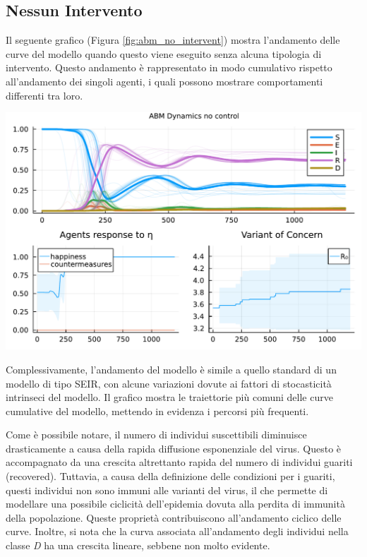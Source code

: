 \newpage

\subsection{Nessun Intervento}

Il seguente grafico (Figura \ref{fig:abm_no_intervent}) mostra l'andamento delle curve del modello quando questo viene eseguito senza alcuna tipologia di intervento. Questo andamento è rappresentato in modo cumulativo rispetto all'andamento dei singoli agenti, i quali possono mostrare comportamenti differenti tra loro.

\begin{minipage}{\linewidth}
    \centering
    \includegraphics[width=\textwidth]{img/SocialNetworkABM_NO_CONTROL.pdf}
    \label{fig:abm_no_intervent}
\end{minipage}

Complessivamente, l'andamento del modello è simile a quello 
standard di un modello di tipo SEIR, con alcune variazioni 
dovute ai fattori di stocasticità intrinseci del modello. 
Il grafico mostra le traiettorie più comuni delle curve cumulative 
del modello, mettendo in evidenza i percorsi più frequenti.

Come è possibile notare, il numero di individui suscettibili 
diminuisce drasticamente a causa della rapida diffusione 
esponenziale del virus. Questo è accompagnato da una crescita 
altrettanto rapida del numero di individui guariti (recovered). 
Tuttavia, a causa della definizione delle condizioni per i guariti, 
questi individui non sono immuni alle varianti del virus, il che 
permette di modellare una possibile ciclicità dell'epidemia 
dovuta alla perdita di immunità della popolazione. 
Queste proprietà contribuiscono all'andamento ciclico delle curve. 
Inoltre, si nota che la curva associata all'andamento degli 
individui nella classe \emph{D} ha una crescita lineare, 
sebbene non molto evidente.

